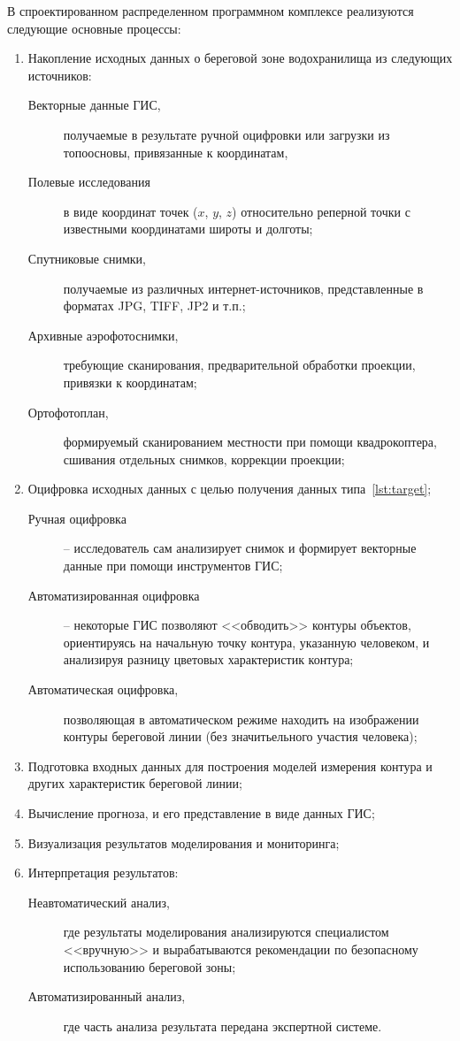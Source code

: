\documentclass[732,14pt,final]{studrep}
\begin{document}
В спроектированном распределенном программном комплексе реализуются следующие основные процессы:
\begin{enumerate}
  \item Накопление исходных данных о береговой зоне водохранилища из следующих источников:
  \begin{description}
    \item [Векторные данные ГИС,] получаемые в результате ручной оцифровки или загрузки из топоосновы, привязанные к координатам, \label{lst:target}
    \item [Полевые исследования] в виде координат точек ($x$, $y$, $z$) относительно реперной точки с известными координатами широты и долготы;
    \item [Спутниковые снимки,] получаемые из различных интернет-источников, представленные в форматах JPG, TIFF, JP2 и т.п.;
    \item [Архивные аэрофотоснимки,] требующие сканирования, предварительной обработки проекции, привязки к координатам;
    \item [Ортофотоплан,] формируемый сканированием местности при помощи квадрокоптера, сшивания отдельных снимков, коррекции проекции;
  \end{description}
  \item Оцифровка исходных данных с целью получения данных типа~\ref{lst:target};
  \begin{description}
    \item[Ручная оцифровка] -- исследователь сам анализирует снимок и формирует векторные данные при помощи инструментов ГИС;
    \item[Автоматизированная оцифровка] -- некоторые ГИС позволяют <<обводить>> контуры объектов, ориентируясь на начальную точку контура, указанную человеком, и анализируя разницу цветовых характеристик контура;
    \item[Автоматическая оцифровка,] позволяющая в автоматическом режиме находить на изображении контуры береговой линии (без значитьельного участия человека);
  \end{description}
  \item Подготовка входных данных для построения моделей измерения контура и других характеристик береговой линии;
  \item Вычисление прогноза, и его представление в виде данных ГИС;
  \item Визуализация результатов моделирования и мониторинга;
  \item Интерпретация результатов:
  \begin{description}
    \item[Неавтоматический анализ,] где результаты моделирования анализируются специалистом <<вручную>> и вырабатываются рекомендации по безопасному использованию береговой зоны;
    \item[Автоматизированный анализ,] где часть анализа результата передана экспертной системе.
  \end{description}
\end{enumerate}
\end{document}
